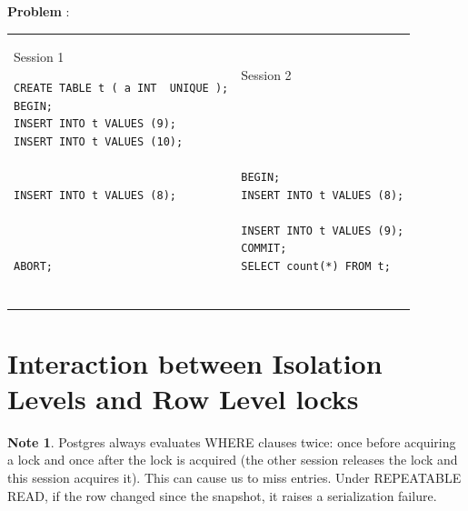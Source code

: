 \documentclass[10pt]{article}
\theoremstyle{definition}
\newtheorem{note}{Note}
\newcounter{ProblemCounter}
\newcommand{\nextproblem}{\filbreak\stepcounter{ProblemCounter} \noindent\textbf{Problem \theProblemCounter}:}
\begin{document}

\nextproblem
\begin{tcolorbox}
\begin{tabular}{p{3.25in}p{3in}}
\hspace{-0.2in}Session 1
\begin{lstlisting}
CREATE TABLE t ( a INT  UNIQUE );
BEGIN;
INSERT INTO t VALUES (9);
INSERT INTO t VALUES (10);


INSERT INTO t VALUES (8);



ABORT;
  
\end{lstlisting}
    &
\hspace{-0.2in}Session 2
\begin{lstlisting}




BEGIN;
INSERT INTO t VALUES (8);

INSERT INTO t VALUES (9);
COMMIT;
SELECT count(*) FROM t;
\end{lstlisting}
\end{tabular}
\vspace{-0.2in}
\end{tcolorbox}
\vspace{0.25in}


\filbreak
\section{Interaction between Isolation Levels and Row Level locks}
\begin{note}
    Postgres always evaluates WHERE clauses twice: once before acquiring a lock and once after the lock is acquired (the other session releases the lock and this session acquires it).
    This can cause us to miss entries.
    Under REPEATABLE READ, if the row changed since the snapshot, it raises a serialization failure.
\end{note}
\end{document}
